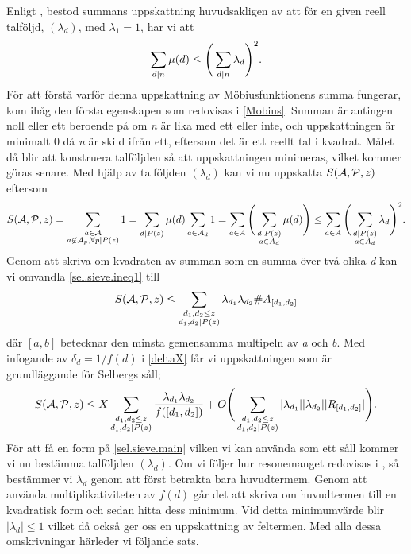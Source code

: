 Enligt \cite{cojocarumurty}, bestod summans uppskattning huvudsakligen av att för en given reell talföljd, \((\lambda_d)\), med \(\lambda_1 = 1\), har vi att 
\begin{equation}
    \sum_{d\divides n}\mu(d) \leq \Bigg(\sum_{d\divides n}\lambda_d\Bigg)^2.\nonumber
\end{equation}
För att förstå varför denna uppskattning av Möbiusfunktionens summa fungerar, kom ihåg den första egenskapen som redovisas i \ref{Mobius}. 
Summan är antingen noll eller ett beroende på om \textit{n} är lika med ett eller inte, och uppskattningen är minimalt 0 då \textit{n} är skild ifrån ett, eftersom det är ett reellt tal i kvadrat.
Målet då blir att konstruera talföljden så att uppskattningen minimeras, vilket kommer göras senare.
Med hjälp av talföljden \((\lambda_d)\) kan vi nu uppskatta \(\S{A}{P}{z}\) eftersom
\begin{equation}
\S{A}{P}{z} = \sum_{\substack{a\in \mathcal{A}\\a\not\in\mathcal{A}_p,\forall p\divides P(z)}} 1 = \sum_{d\divides P(z)} \mu(d) \sum_{a\in\mathcal{A}_d}1 = \sum_{a\in A} \Bigg(\sum_{\substack{d\divides P(z)\\a\in A_d}}\mu(d)\Bigg)\leq \sum_{a\in A}\Bigg(\sum_{\substack{d\divides P(z)\\a\in A_d}}\lambda_d\Bigg)^2.\label{sel.sieve.ineq1}
\end{equation}
Genom att skriva om kvadraten av summan som en summa över två olika \textit{d} kan vi omvandla \eqref{sel.sieve.ineq1} till
\begin{equation}
    \S{A}{P}{z} \leq \sum_{\substack{d_1,d_2\leq z\\d_1,d_2\divides P(z)}}\lambda_{d_1}\lambda_{d_2}\#A_{[d_1, d_2]}\nonumber
\end{equation}
där \([a, b]\) betecknar den minsta gemensamma multipeln av \textit{a} och \textit{b}. 
Med infogande av \(\delta_d = 1/f(d)\) i \eqref{deltaX} får vi uppskattningen som är grundläggande för Selbergs såll;
\begin{equation}
    \S{A}{P}{z} \leq X\sum_{\substack{d_1,d_2\leq z\\d_1,d_2\divides P(z)}}\frac{\lambda_{d_1}\lambda_{d_2}}{f([d_1,d_2])} + O\Bigg(\sum_{\substack{d_1,d_2\leq z\\d_1,d_2\divides P(z)}}|\lambda_{d_1}||\lambda_{d_2}||R_{[d_1, d_2]}|\Bigg)\label{sel.sieve.main}.
\end{equation}
För att få en form på \eqref{sel.sieve.main} vilken vi kan använda som ett såll kommer vi nu bestämma talföljden \((\lambda_d)\). 
Om vi följer hur resonemanget redovisas i \cite{cojocarumurty}, så bestämmer vi \(\lambda_d\) genom att först betrakta bara huvudtermem. 
Genom att använda multiplikativiteten av \(f(d)\) går det att skriva om huvudtermen till en kvadratisk form och sedan hitta dess minimum. 
Vid detta minimumvärde blir \(|\lambda_d|\leq 1\) vilket då också ger oss en uppskattning av feltermen. Med alla dessa omskrivningar härleder vi följande sats.

